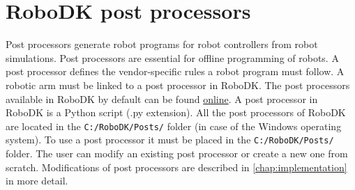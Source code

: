 \section{RoboDK post processors}

Post processors generate robot programs for robot controllers from robot simulations. Post processors are essential for offline programming of robots. A post processor defines the vendor-specific rules a robot program must follow. A robotic arm must be linked to a post processor in RoboDK. The post processors available in RoboDK by default can be found \href{https://robodk.com/doc/en/Post-Processors.html#AvailablePosts}{online}.  
A post processor in RoboDK is a Python script (.py extension). All the post processors of RoboDK are located in the
\texttt{C:/RoboDK/Posts/} folder (in case of the Windows operating system).  To use a post processor it must be placed in the \texttt{C:/RoboDK/Posts/} folder. The user can modify an existing post processor or create a new one from scratch. Modifications of post processors are described in \autoref{chap:implementation} in more detail. 
